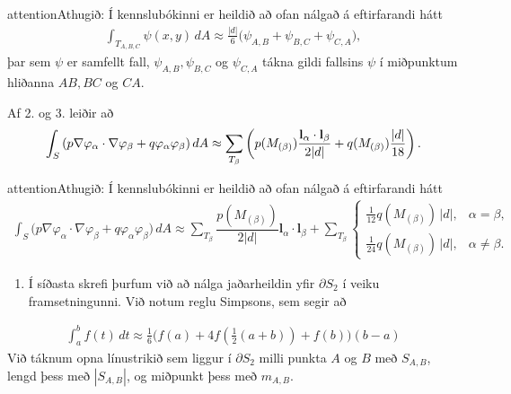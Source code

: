 \documentclass[a4paper,10pt,icelandic]{sphinxmanual}
\begin{document}
\begin{sphinxadmonition}{attention}{Athugið:}
Í kennslubókinni er heildið að ofan nálgað á eftirfarandi hátt
\begin{equation*}
\begin{split}\int_{T_{A,B,C}} \psi(x,y)\, dA
\approx \tfrac{|d|}{6}\big(\psi_{A,B}+\psi_{B,C}+\psi_{C,A}\big),\end{split}
\end{equation*}
þar sem \(\psi\) er samfellt fall, \(\psi_{A,B}, \psi_{B,C}\) og \(\psi_{C,A}\) tákna gildi fallsins \(\psi\) í miðpunktum hliðanna \(AB, BC\) og \(CA\).
\end{sphinxadmonition}

Af 2. og 3. leiðir að
\begin{equation*}
\begin{split}\int_S \left(p \nabla \varphi_\alpha \cdot \nabla \varphi_\beta + q \varphi_\alpha \varphi_\beta\right) dA \approx
\sum_{T_{\beta}}\left(p(M_{(\beta)}){{\mathbf l}_\alpha\cdot {\mathbf l}_\beta\over 2|d|}+q(M_{(\beta)}){|d|\over 18}\right).\end{split}
\end{equation*}
\begin{sphinxadmonition}{attention}{Athugið:}
Í kennslubókinni er heildið að ofan nálgað á eftirfarandi hátt
\begin{equation*}
\begin{split}\int_{S}\big(p\nabla \varphi_\alpha\cdot \nabla \varphi_\beta
+q\varphi_\alpha\varphi_\beta\big)\, dA
\approx
\sum_{T_{\beta}}\dfrac {p(M_{(\beta)})}{2 |d|}{{\mathbf l}_\alpha\cdot {\mathbf l}_\beta}
+\sum_{T_{\beta}}\begin{cases}
\tfrac 1{12} q(M_{(\beta)})\, |d|,& \alpha=\beta,\\
\tfrac 1{24} q(M_{(\beta)})\, |d|,& \alpha\neq \beta.
\end{cases}\end{split}
\end{equation*}\end{sphinxadmonition}
\begin{enumerate}
\def\theenumi{\arabic{enumi}}
\def\labelenumi{\theenumi .}
\makeatletter\def\p@enumii{\p@enumi \theenumi .}\makeatother
\setcounter{enumi}{3}
\item {} 
Í síðasta skrefi þurfum við að nálga jaðarheildin yfir \(\partial S_2\) í veiku framsetningunni. Við notum reglu Simpsons, sem segir að

\end{enumerate}
\begin{equation*}
\begin{split}\int_a^b f(t)\, dt\approx \tfrac 16\big(f(a)+4f(\tfrac
12(a+b))+f(b)\big)(b-a)\end{split}
\end{equation*}
Við táknum opna línustrikið sem liggur í \(\partial S_2\) milli punkta \(A\) og \(B\) með \(S_{A,B}\),  lengd þess með \(|S_{A,B}|\), og miðpunkt þess með \(m_{A,B}\).
\end{document}
